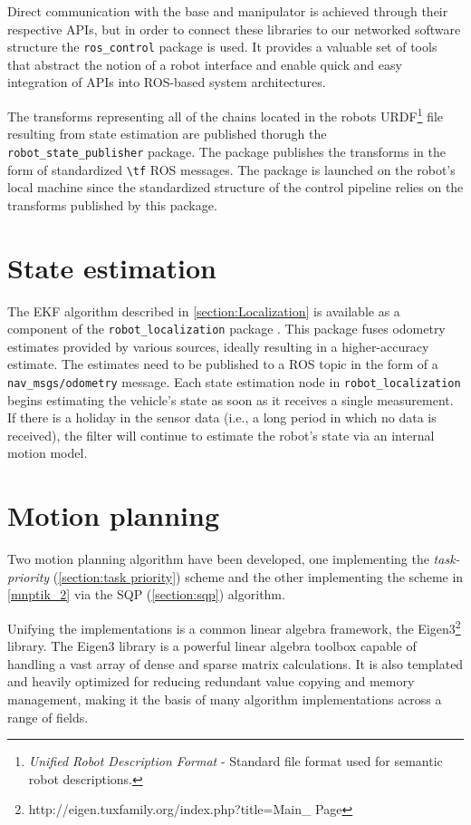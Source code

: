 \documentclass[times, utf8, diplomski, english]{fer}
\begin{document}
Direct communication with the base and manipulator is achieved through their respective APIs, but in order to connect these libraries to our networked software structure the \verb|ros_control| package is used. 
It provides a valuable set of tools that abstract the notion of a robot interface and enable quick and easy integration of APIs into ROS-based system architectures.

The transforms representing all of the chains located in the robots URDF\footnote{\textit{Unified Robot Description Format} - Standard file format used for semantic robot descriptions.} file resulting from state estimation are published thorugh the \verb|robot_state_publisher| package. The package publishes the transforms in the form of standardized \verb|\tf| ROS messages.
The package is launched on the robot's local machine since the standardized structure of the control pipeline relies on the transforms published by this package.

\section{State estimation}\label{section:code state estimation}
The EKF algorithm described in \autoref{section:Localization} is available as a component of the \verb|robot_localization| package \citep{MooreStouchKeneralizedEkf2014}.
This package fuses odometry estimates provided by various sources, ideally resulting in a higher-accuracy estimate.
The estimates need to be published to a ROS topic in the form of a \verb|nav_msgs/odometry| message.
Each state estimation node in \verb|robot_localization| begins estimating the vehicle’s state as soon as it receives a single measurement. If there is a holiday in the sensor data (i.e., a long period in which no data is received), the filter will continue to estimate the robot’s state via an internal motion model.

\section{Motion planning}\label{section:code motion planning}
Two motion planning algorithm have been developed, one implementing the \textit{task-priority} (\autoref{section:task priority}) scheme and the other implementing the scheme in \eqref{mnptik_2} via the SQP (\autoref{section:sqp}) algorithm.

Unifying the implementations is a common linear algebra framework, the Eigen3\footnote{http://eigen.tuxfamily.org/index.php?title=Main\_ Page} library.
The Eigen3 library is a powerful linear algebra toolbox capable of handling a vast array of dense and sparse matrix calculations.
It is also templated and heavily optimized for reducing redundant value copying and memory management, making it the basis of many algorithm implementations across a range of fields.
\end{document}
